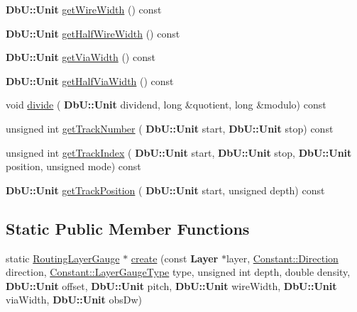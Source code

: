 \begin{DoxyCompactItemize}
\textbf{ Db\+U\+::\+Unit} \hyperlink{classCRL_1_1RoutingLayerGauge_ab29fa7895f4fe661eb85bed9f6a5860e}{get\+Wire\+Width} () const
\item 
\textbf{ Db\+U\+::\+Unit} \hyperlink{classCRL_1_1RoutingLayerGauge_a57183085c39be7edcb87f4f770f8e535}{get\+Half\+Wire\+Width} () const
\item 
\textbf{ Db\+U\+::\+Unit} \hyperlink{classCRL_1_1RoutingLayerGauge_ac0783d29a7f9f6a2f02ac72f3196d637}{get\+Via\+Width} () const
\item 
\textbf{ Db\+U\+::\+Unit} \hyperlink{classCRL_1_1RoutingLayerGauge_a0f090ea25ef6f88e691fc6e572f79e16}{get\+Half\+Via\+Width} () const
\item 
void \hyperlink{classCRL_1_1RoutingLayerGauge_ab8d5ae22c453605226b2695c2568c4f5}{divide} (\textbf{ Db\+U\+::\+Unit} dividend, long \&quotient, long \&modulo) const
\item 
unsigned int \hyperlink{classCRL_1_1RoutingLayerGauge_ab9bbb7959ca58438d59709398044daae}{get\+Track\+Number} (\textbf{ Db\+U\+::\+Unit} start, \textbf{ Db\+U\+::\+Unit} stop) const
\item 
unsigned int \hyperlink{classCRL_1_1RoutingLayerGauge_ad61cdf130c8b739bb44a01cfd5968022}{get\+Track\+Index} (\textbf{ Db\+U\+::\+Unit} start, \textbf{ Db\+U\+::\+Unit} stop, \textbf{ Db\+U\+::\+Unit} position, unsigned mode) const
\item 
\textbf{ Db\+U\+::\+Unit} \hyperlink{classCRL_1_1RoutingLayerGauge_a470828019c5cde566e7aa6d27ef68439}{get\+Track\+Position} (\textbf{ Db\+U\+::\+Unit} start, unsigned depth) const
\end{DoxyCompactItemize}
\subsection*{Static Public Member Functions}
\begin{DoxyCompactItemize}
\item 
static \hyperlink{classCRL_1_1RoutingLayerGauge}{Routing\+Layer\+Gauge} $\ast$ \hyperlink{classCRL_1_1RoutingLayerGauge_afe17db013bf6a933c2af4e847bfd7918}{create} (const \textbf{ Layer} $\ast$layer, \hyperlink{namespaceConstant_ac081a99f2b64361919ed5d9f37c0f9af}{Constant\+::\+Direction} direction, \hyperlink{namespaceConstant_ab2e46a17cc373a268c5c24fa0e2067e5}{Constant\+::\+Layer\+Gauge\+Type} type, unsigned int depth, double density, \textbf{ Db\+U\+::\+Unit} offset, \textbf{ Db\+U\+::\+Unit} pitch, \textbf{ Db\+U\+::\+Unit} wire\+Width, \textbf{ Db\+U\+::\+Unit} via\+Width, \textbf{ Db\+U\+::\+Unit} obs\+Dw)
\end{DoxyCompactItemize}


